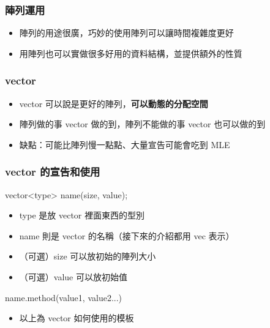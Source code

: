 \documentclass[mathserif]{beamer}
\begin{document}
\begin{frame}
    \frametitle{陣列運用}
    \begin{itemize}
        \item 陣列的用途很廣，巧妙的使用陣列可以讓時間複雜度更好
        \item 用陣列也可以實做很多好用的資料結構，並提供額外的性質
    \end{itemize}
\end{frame}

\begin{frame}
    \frametitle{vector}
    \begin{itemize}
        \item vector 可以說是更好的陣列，\textbf{可以動態的分配空間}
        \item 陣列做的事 vector 做的到，陣列不能做的事 vector 也可以做的到
        \item 缺點：可能比陣列慢一點點、大量宣告可能會吃到 MLE
    \end{itemize}
\end{frame}

\begin{frame}
    \frametitle{vector 的宣告和使用}
    vector<{\color[rgb]{1,0,0}type}> {\color[rgb]{1,0,0}name}({\color[rgb]{1,0,0}size}, {\color[rgb]{1,0,0}value});
    \begin{itemize}
        \item type 是放 vector 裡面東西的型別
        \item name 則是 vector 的名稱（接下來的介紹都用 vec 表示）
        \item （可選）size 可以放初始的陣列大小
        \item （可選）value 可以放初始值
    \end{itemize}
    \vspace{0.5cm}
    {\color[rgb]{1,0,0}name}.{\color[rgb]{1,0,0}method}({\color[rgb]{1,0,0}value1}, {\color[rgb]{1,0,0}value2}...)
    \begin{itemize}
        \item 以上為 vector 如何使用的模板
    \end{itemize}
\end{frame}
\end{document}

